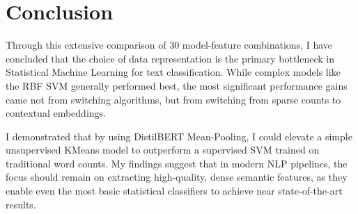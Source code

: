 \documentclass[11pt]{article}
\begin{document}
\section{Conclusion}
Through this extensive comparison of 30 model-feature combinations, I have concluded that the choice of data representation is the primary bottleneck in Statistical Machine Learning for text classification. While complex models like the RBF SVM generally performed best, the most significant performance gains came not from switching algorithms, but from switching from sparse counts to contextual embeddings.

I demonstrated that by using DistilBERT Mean-Pooling, I could elevate a simple unsupervised KMeans model to outperform a supervised SVM trained on traditional word counts. My findings suggest that in modern NLP pipelines, the focus should remain on extracting high-quality, dense semantic features, as they enable even the most basic statistical classifiers to achieve near state-of-the-art results.
\end{document}
